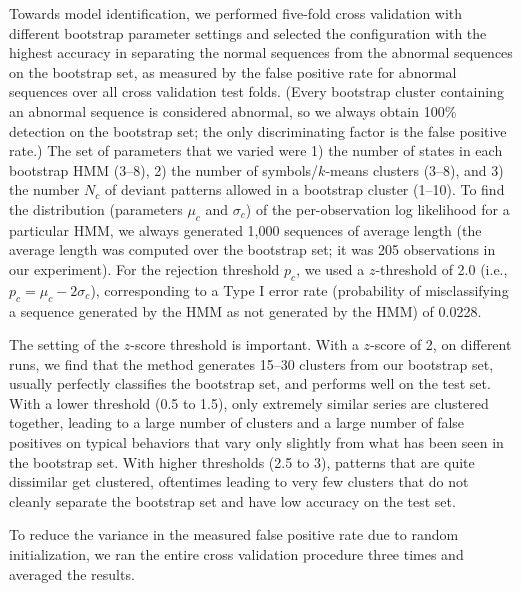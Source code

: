Towards model identification, we performed five-fold cross validation
with different bootstrap parameter settings and selected the
configuration with the highest accuracy in separating the normal
sequences from the abnormal sequences on the bootstrap set, as
measured by the false positive rate for abnormal sequences over all
cross validation test folds. (Every bootstrap cluster containing an
abnormal sequence is considered abnormal, so we always obtain 100\%
detection on the bootstrap set; the only discriminating factor is the
false positive rate.) The set of parameters that we varied were 1) the
number of states in each bootstrap HMM (3--8), 2) the number of
symbols/$k$-means clusters (3--8), and 3) the number $N_c$ of deviant
patterns allowed in a bootstrap cluster (1--10). To find the
distribution (parameters $\mu_c$ and $\sigma_c$) of the
per-observation log likelihood for a particular HMM, we always
generated 1,000 sequences of average length (the average length was
computed over the bootstrap set; it was 205 observations in our
experiment). For the rejection threshold $p_c$, we used a
$z$-threshold of 2.0 (i.e., $p_c = \mu_c - 2\sigma_c$), corresponding
to a Type I error rate (probability of misclassifying a sequence
generated by the HMM as not generated by the HMM) of 0.0228.

The setting of the $z$-score threshold is important. With a $z$-score
of 2, on different runs, we find that the method generates 15--30
clusters from our bootstrap set, usually perfectly classifies the
bootstrap set, and performs well on the test set. With a lower
threshold (0.5 to 1.5), only extremely similar series are clustered
together, leading to a large number of clusters and a large number of
false positives on typical behaviors that vary only slightly from what
has been seen in the bootstrap set. With higher thresholds (2.5 to 3),
patterns that are quite dissimilar get clustered, oftentimes leading
to very few clusters that do not cleanly separate the bootstrap set
and have low accuracy on the test set.

To reduce the variance in the measured false positive rate due to
random initialization, we ran the entire cross validation procedure
three times and averaged the results.

